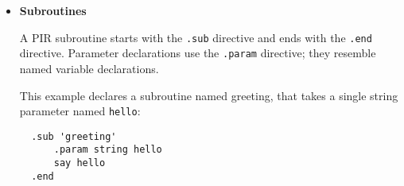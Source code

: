 \begin{itemize}
\item {\bf Subroutines }

A PIR subroutine starts with the \verb|.sub| directive and ends with the
\verb|.end| directive. 
Parameter declarations use the \verb|.param| directive;
they resemble named variable declarations. 

This example declares a
subroutine named greeting, that takes a single string parameter
named \verb|hello|:

\begin{verbatim}
  .sub 'greeting'
      .param string hello
      say hello
  .end
\end{verbatim}
\end{itemize}

